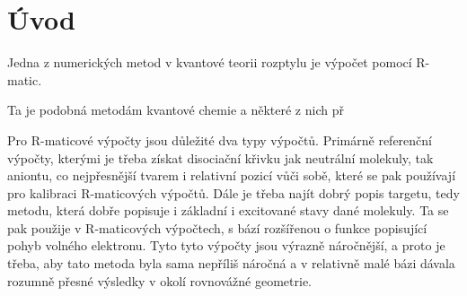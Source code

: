 \chapter*{Úvod}

Jedna z numerických metod v kvantové teorii rozptylu je výpočet pomocí R-matic.

Ta je podobná metodám kvantové chemie a některé z nich př\TD

Pro R-maticové výpočty jsou důležité dva typy výpočtů. Primárně referenční výpočty, 
kterými je třeba 
získat disociační křivku jak neutrální molekuly, tak aniontu, co nejpřesnější tvarem i 
relativní pozicí vůči sobě, které se pak používají pro kalibraci R-maticových výpočtů.
Dále je třeba najít dobrý popis targetu, tedy metodu, která dobře popisuje i základní i 
excitované stavy dané molekuly. Ta se pak použije v R-maticových výpočtech, 
s bází rozšířenou o funkce popisující pohyb volného elektronu. Tyto tyto výpočty jsou výrazně náročnější, a proto je třeba, aby tato metoda byla sama nepříliš náročná a v relativně malé bázi dávala rozumně přesné výsledky v okolí rovnovážné geometrie.